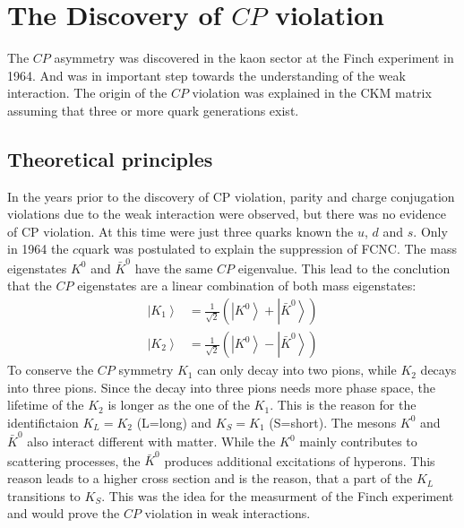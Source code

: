 \section{The Discovery of $CP$ violation \cite{Kaonen}}
The $CP$ asymmetry was discovered in the kaon sector at the Finch experiment in 1964. And was in important step towards the understanding of the weak interaction. The origin of the $CP$ violation was explained in the CKM matrix assuming that three or more quark generations exist.

\subsection{Theoretical principles}
In the years prior to the discovery of CP violation, parity and charge conjugation violations due to the weak interaction were observed, but there was no evidence of CP violation. At this time were just three quarks known the $u$, $d$ and $s$. Only in 1964 the $c$quark was postulated to explain the suppression of FCNC. The mass eigenstates $K^0$ and $\bar{K}^0$ have the same $CP$ eigenvalue. This lead to the conclution that the $CP$ eigenstates are a linear combination of both mass eigenstates:
\begin{align*}
    \left|K_1 \right> &= \frac{1}{\sqrt{2}} \left(\left|K^0\right> +
                        \left|\bar{K}^0\right> \right) \\
    \left|K_2 \right> &= \frac{1}{\sqrt{2}} \left(\left|K^0\right> -
                        \left|\bar{K}^0\right> \right)
\end{align*}
To conserve the $CP$ symmetry $K_1$ can only decay into two pions, while $K_2$ decays into three pions. Since the decay into three pions needs more phase space, the lifetime of the $K_2$ is longer as the one of the $K_1$. This is the reason for the identifictaion $K_L =K_2$ (L=long) and $K_S =K_1$ (S=short). The mesons $K^0$ and $\bar{K}^0$ also interact different with matter. While the $K^0$ mainly contributes to scattering processes, the $\bar{K}^0$ produces additional excitations of hyperons. This reason leads to a higher cross section and is the reason, that a part of the $K_L$ transitions to $K_S$. This was the idea for the measurment of the Finch experiment and would prove the $CP$ violation in weak interactions.

